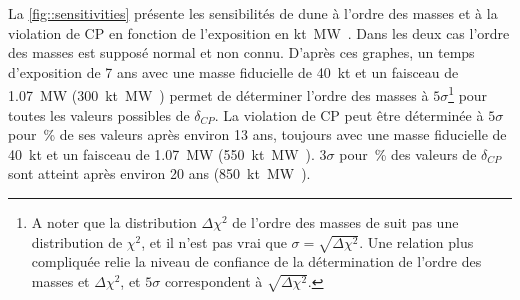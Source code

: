         La \autoref{fig::sensitivities} présente les sensibilités de \gls{dune} à l'ordre des masses et à la violation de CP en fonction de l'exposition en \si{\kilo\tonne\mega\watt\year}. Dans les deux cas l'ordre des masses est supposé normal et  non connu. %
        D'après ces graphes, un temps d'exposition de 7 ans avec une masse fiducielle de \SI{40}{\kilo\tonne} et un faisceau de \SI{1.07}{\mega\watt} (\SI{300}{\kilo\tonne\mega\watt\year}) %
        permet de déterminer l'ordre des masses à $5\sigma$\footnote{A noter que la distribution $\Delta \chi^2$ de l'ordre des masses de suit pas une distribution de $\chi^2$, et il n'est pas vrai que $\sigma=\sqrt{\Delta \chi^2}$. Une relation plus compliquée relie la niveau de confiance de la détermination de l'ordre des masses et $\Delta \chi^2$\cite{Ciuffoli2013}, et $5\sigma$ correspondent à $\sqrt{\Delta \chi^2}$.} pour toutes les valeurs possibles de $\delta_{CP}$. La violation de CP peut être déterminée à $5\sigma$ pour \,\% de ses valeurs après environ 13 ans, toujours avec une masse fiducielle de \SI{40}{\kilo\tonne} et un faisceau de \SI{1.07}{\mega\watt} (\SI{550}{\kilo\tonne\mega\watt\year}). $3\sigma$ pour \,\% des valeurs de $\delta_{CP}$ sont atteint après environ 20 ans (\SI{850}{\kilo\tonne\mega\watt\year}).


